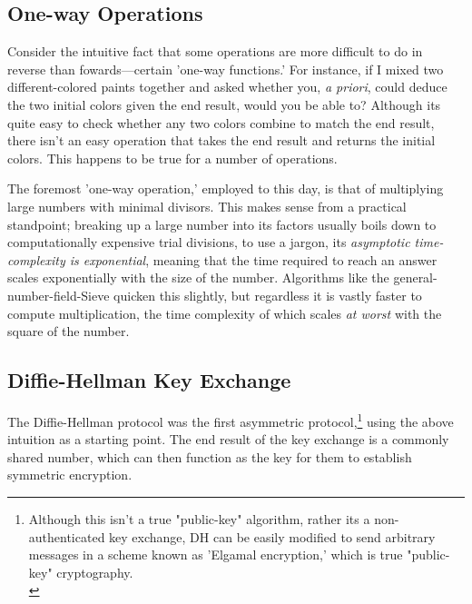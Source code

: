 \documentclass[11pt, a4paper]{report}
\begin{document}

\subsection{One-way Operations}

Consider the intuitive fact that some operations are more difficult to do in reverse than fowards—certain 'one-way functions.' For instance, if I mixed two different-colored paints together and asked whether you, \textit{a priori}, could deduce the two initial colors given the end result, would you be able to? Although its quite easy to check whether any two colors combine to match the end result, there isn't an easy operation that takes the end result and returns the initial colors. This happens to be true for a number of operations. 

The foremost 'one-way operation,' employed to this day, is that of multiplying large numbers with minimal divisors. This makes sense from a practical standpoint; breaking up a large number into its factors usually boils down to computationally expensive trial divisions, to use a jargon, its \textit{asymptotic time-complexity is exponential}, meaning that the time required to reach an answer scales exponentially with the size of the number. Algorithms like the general-number-field-Sieve quicken this slightly,\autocite[1482]{pomerance} but regardless it is vastly faster to compute multiplication, the time complexity of which scales \textit{at worst} with the square of the number.\autocite{bunimov}

\subsection{Diffie-Hellman Key Exchange}

The Diffie-Hellman protocol was the first asymmetric protocol,\footnote{Although this isn't a true "public-key" algorithm, rather its a non-authenticated key exchange, DH can be easily modified to send arbitrary messages in a scheme known as 'Elgamal encryption,' which is true "public-key" cryptography.\\\autocite{elgamal}} using the above intuition as a starting point. The end result of the key exchange is a commonly shared number, which can then function as the key for them to establish symmetric encryption.
\end{document}
